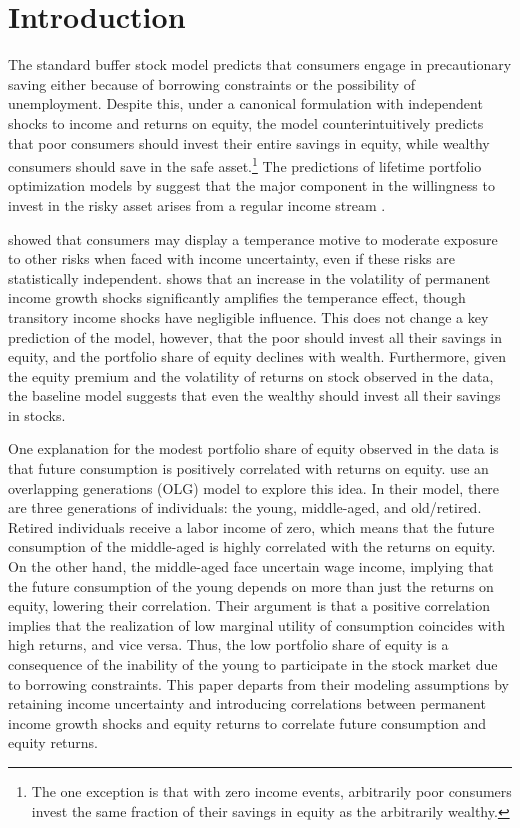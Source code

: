 \section{Introduction}

The standard buffer stock model \citep{Deaton1991, Carroll1992} predicts that consumers engage in precautionary saving either because of borrowing constraints or the possibility of unemployment. Despite this, under a canonical formulation with independent shocks to income and returns on equity, the model counterintuitively predicts that poor consumers should invest their entire savings in equity, while wealthy consumers should save in the safe asset.\footnote{The one exception is that with zero income events, arbitrarily poor consumers invest the same fraction of their savings in equity as the arbitrarily wealthy.} The predictions of lifetime portfolio optimization models by \citet{Merton1969, Samuelson1969} suggest that the major component in the willingness to invest in the risky asset arises from a regular income stream \citep{Heaton1997}. 

\citet{Kimball1991} showed that consumers may display a temperance motive to moderate exposure to other risks when faced with income uncertainty, even if these risks are statistically independent. \citet{Koo1999} shows that an increase in the volatility of permanent income growth shocks significantly amplifies the temperance effect, though transitory income shocks have negligible influence. This does not change a key prediction of the model, however, that the poor should invest all their savings in equity, and the portfolio share of equity declines with wealth. Furthermore, given the equity premium and the volatility of returns on stock observed in the data, the baseline model suggests that even the wealthy should invest all their savings in stocks.

One explanation for the modest portfolio share of equity observed in the data is that future consumption is positively correlated with returns on equity. \citet{Constantinides2002} use an overlapping generations (OLG) model to explore this idea. In their model, there are three generations of individuals: the young, middle-aged, and old/retired. Retired individuals receive a labor income of zero, which means that the future consumption of the middle-aged is highly correlated with the returns on equity. On the other hand, the middle-aged face uncertain wage income, implying that the future consumption of the young depends on more than just the returns on equity, lowering their correlation. Their argument is that a positive correlation implies that the realization of low marginal utility of consumption coincides with high returns, and vice versa. Thus, the low portfolio share of equity is a consequence of the inability of the young to participate in the stock market due to borrowing constraints. This paper departs from their modeling assumptions by retaining income uncertainty and introducing correlations between permanent income growth shocks and equity returns to correlate future consumption and equity returns.

